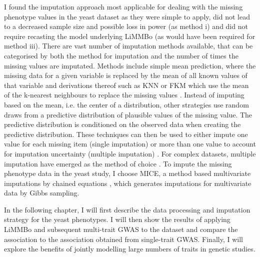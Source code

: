 I found the imputation approach most applicable for dealing with the missing phenotype values in the yeast dataset as they were simple to apply, did not lead to a decreased sample size and possible loss in power (as method i) and did not require recasting the model underlying LiMMBo (as would have been required for method iii). There are vast number of imputation methods available, that can be categorised by both the method for imputation and the number of times the missing values are imputated. Methods include simple mean prediction, where the missing data for a given variable is replaced by the mean of all known values of that variable and derivations thereof such as KNN or FKM which use the mean of the k-nearest neighbours to replace the missing values \citep{Troyanskaya200,Li2004}. Instead of imputing based on the mean, i.e. the center of a distribution, other strategies use random draws from a predictive distribution of plausible values of the missing value. The predictive distribution is conditioned on the observed data when creating the predictive distribution. These techniques can then be used to either impute one value for each missing item (single imputation) or more than one value to account for imputation uncertainty (multiple imputation) \citep{Rubin2002}. For complex datasets, multiple imputation have emerged as the method of choice \citep{Rubin1987,Schafer1997}. To impute the missing phenotype data in the yeast study, I choose MICE, a method based multivariate imputations by chained equations \citep{vanBuuren2011}, which generates imputations for multivariate data by Gibbs sampling. 

In the following chapter, I will first describe the data processing and imputation strategy for the yeast phenotypes. I will then show the results of applying LiMMBo and subsequent multi-trait GWAS to the dataset and compare the association to the association obtained from single-trait GWAS. Finally, I will explore the benefits of jointly modelling large numbers of traits in genetic studies.
